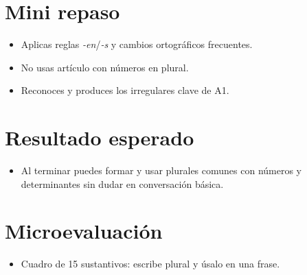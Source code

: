 \section{Mini repaso}
\begin{itemize}[leftmargin=*]
	\item Aplicas reglas \textit{-en}/\textit{-s} y cambios ortográficos frecuentes.
	\item No usas artículo con números en plural.
	\item Reconoces y produces los irregulares clave de A1.
\end{itemize}

\section{Resultado esperado}
\begin{itemize}[leftmargin=*]
	\item Al terminar puedes formar y usar plurales comunes con números y determinantes sin dudar en conversación básica.
\end{itemize}

\section{Microevaluación}
\begin{itemize}[leftmargin=*]
	\item Cuadro de 15 sustantivos: escribe plural y úsalo en una frase.
\end{itemize}
